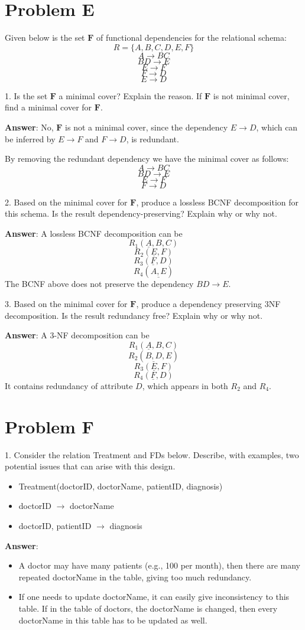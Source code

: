 \documentclass{article}
\begin{document}
\section{Problem E}
Given below is the set $\mathbf{F}$ of functional dependencies for the relational schema:
$$R = \{A, B, C, D, E, F\}$$
$$A \to BC$$
$$BD \to E$$
$$E \to F$$
$$F \to D$$
$$E \to D$$

1. Is the set $\mathbf{F}$ a minimal cover? Explain the reason. If $\mathbf{F}$ is not minimal cover, find a minimal cover for $\mathbf{F}$.

{\bf Answer}: No, $\mathbf{F}$ is not a minimal cover, since the dependency $E \to D$, which can be inferred by $E \to F$ and $F \to D$, is redundant.

By removing the redundant dependency we have the minimal cover as follows:
$$A \to BC$$
$$BD \to E$$
$$E \to F$$
$$F \to D$$

2. Based on the minimal cover for $\mathbf{F}$, produce a lossless BCNF decomposition for this schema. Is the result dependency-preserving? Explain why or why not.

{\bf Answer}: A lossless BCNF decomposition can be
$$R_1 (\underline{A}, B, C)$$
$$R_2 (\underline{E}, F)$$
$$R_3 (\underline{F}, D)$$
$$R_4 (\underline{A, E})$$
The BCNF above does not preserve the dependency $BD \to E$.

3. Based on the minimal cover for $\mathbf{F}$, produce a dependency preserving 3NF decomposition. Is the result redundancy free? Explain why or why not.

{\bf Answer}: A 3-NF decomposition can be
$$R_1 (\underline{A}, B, C)$$
$$R_2 (\underline{B, D}, E)$$
$$R_3 (\underline{E}, F)$$
$$R_4 (\underline{F}, D)$$
It contains redundancy of attribute $D$, which appears in both $R_2$ and $R_4$.

\section{Problem F}
1. Consider the relation Treatment and FDs below. Describe, with examples, two potential issues that can arise with this design.
\begin{itemize}
\item Treatment(doctorID, doctorName, patientID, diagnosis)
\item doctorID $\to$ doctorName
\item doctorID, patientID $\to$ diagnosis
\end{itemize}

{\bf Answer}: 
\begin{itemize}
\item A doctor may have many patients (e.g., 100 per month), then there are many repeated doctorName in the table, giving too much redundancy.
\item If one needs to update doctorName, it can easily give inconsistency to this table. If in the table of doctors, the doctorName is changed, then every doctorName in this table has to be updated as well. 
\end{itemize}
\end{document}
